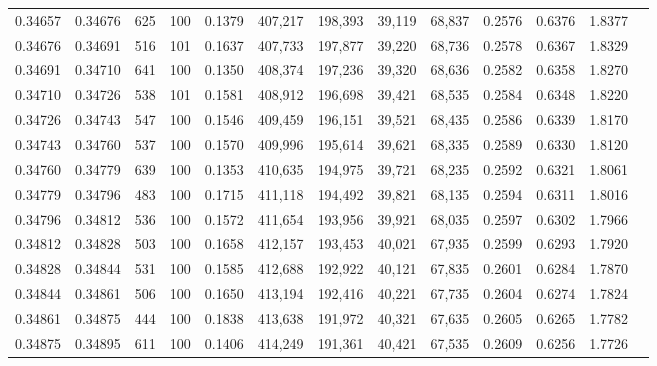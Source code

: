 \begin{tabular}{rrrrrrrrrrrrr}
0.34657 & 0.34676 &   625 & 100 &                                     0.1379 & 407,217 & 198,393 &  39,119 &  68,837 & 0.2576 & 0.6376 & 1.8377 \\
0.34676 & 0.34691 &   516 & 101 &                                     0.1637 & 407,733 & 197,877 &  39,220 &  68,736 & 0.2578 & 0.6367 & 1.8329 \\
0.34691 & 0.34710 &   641 & 100 &                                     0.1350 & 408,374 & 197,236 &  39,320 &  68,636 & 0.2582 & 0.6358 & 1.8270 \\
0.34710 & 0.34726 &   538 & 101 &                                     0.1581 & 408,912 & 196,698 &  39,421 &  68,535 & 0.2584 & 0.6348 & 1.8220 \\
0.34726 & 0.34743 &   547 & 100 &                                     0.1546 & 409,459 & 196,151 &  39,521 &  68,435 & 0.2586 & 0.6339 & 1.8170 \\
0.34743 & 0.34760 &   537 & 100 &                                     0.1570 & 409,996 & 195,614 &  39,621 &  68,335 & 0.2589 & 0.6330 & 1.8120 \\
0.34760 & 0.34779 &   639 & 100 &                                     0.1353 & 410,635 & 194,975 &  39,721 &  68,235 & 0.2592 & 0.6321 & 1.8061 \\
0.34779 & 0.34796 &   483 & 100 &                                     0.1715 & 411,118 & 194,492 &  39,821 &  68,135 & 0.2594 & 0.6311 & 1.8016 \\
0.34796 & 0.34812 &   536 & 100 &                                     0.1572 & 411,654 & 193,956 &  39,921 &  68,035 & 0.2597 & 0.6302 & 1.7966 \\
0.34812 & 0.34828 &   503 & 100 &                                     0.1658 & 412,157 & 193,453 &  40,021 &  67,935 & 0.2599 & 0.6293 & 1.7920 \\
0.34828 & 0.34844 &   531 & 100 &                                     0.1585 & 412,688 & 192,922 &  40,121 &  67,835 & 0.2601 & 0.6284 & 1.7870 \\
0.34844 & 0.34861 &   506 & 100 &                                     0.1650 & 413,194 & 192,416 &  40,221 &  67,735 & 0.2604 & 0.6274 & 1.7824 \\
0.34861 & 0.34875 &   444 & 100 &                                     0.1838 & 413,638 & 191,972 &  40,321 &  67,635 & 0.2605 & 0.6265 & 1.7782 \\
0.34875 & 0.34895 &   611 & 100 &                                     0.1406 & 414,249 & 191,361 &  40,421 &  67,535 & 0.2609 & 0.6256 & 1.7726 \\

\end{tabular}
